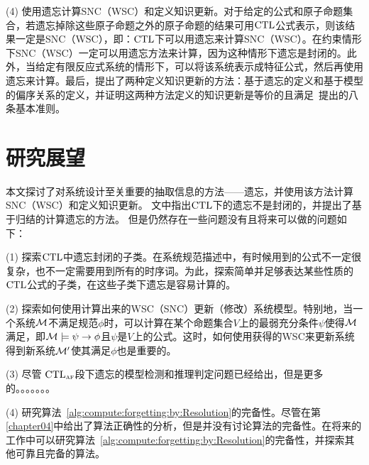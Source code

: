(4) 使用遗忘计算SNC（WSC）和定义知识更新。对于给定的公式和原子命题集合，若遗忘掉除这些原子命题之外的原子命题的结果可用$\textrm{CTL}$公式表示，则该结果一定是SNC（WSC），即：$\textrm{CTL}$下可以用遗忘来计算SNC（WSC）。在约束情形下SNC（WSC）一定可以用遗忘方法来计算，因为这种情形下遗忘是封闭的。此外，当给定有限反应式系统的情形下，可以将该系统表示成特征公式，然后再使用遗忘来计算。最后，提出了两种定义知识更新的方法：基于遗忘的定义和基于模型的偏序关系的定义，并证明这两种方法定义的知识更新是等价的且满足~\citeauthor{katsuno91mendelzon}提出的八条基本准则。




\section{研究展望}
本文探讨了对系统设计至关重要的抽取信息的方法——遗忘，并使用该方法计算SNC（WSC）和定义知识更新。
文中指出$\textrm{CTL}$下的遗忘不是封闭的，并提出了基于归结的计算遗忘的方法。
但是仍然存在一些问题没有且将来可以做的问题如下：

(1) 探索$\textrm{CTL}$中遗忘封闭的子类。在系统规范描述中，有时候用到的公式不一定很复杂，也不一定需要用到所有的时序词。为此，探索简单并足够表达某些性质的$\textrm{CTL}$公式的子类，在这些子类下遗忘是容易计算的。

(2) 探索如何使用计算出来的WSC（SNC）更新（修改）系统模型。特别地，当一个系统$\cal M$不满足规范$\phi$时，可以计算在某个命题集合$V$上的最弱充分条件$\psi$使得${\cal M}$满足，即${\cal M}\models\psi\rightarrow \phi$且$\psi$是$V$上的公式。这时，如何使用获得的WSC来更新系统得到新系统${\cal M}'$使其满足$\phi$也是重要的。


(3) 尽管 $\textrm{CTL}_{\textsc{a}\textsc{f}}$段下遗忘的模型检测和推理判定问题已经给出，但是更多的。。。。。。。

(4) 研究算法~\ref{alg:compute:forgetting:by:Resolution}的完备性。尽管在第\ref{chapter04}中给出了算法正确性的分析，但是并没有讨论算法的完备性。在将来的工作中可以研究算法~\ref{alg:compute:forgetting:by:Resolution}的完备性，并探索其他可靠且完备的算法。

